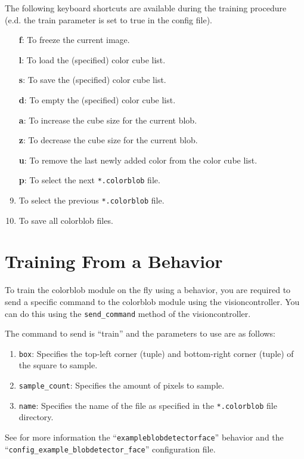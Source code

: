 \documentclass[a4paper, 10pt]{article}
\begin{document}
The following keyboard shortcuts are available during the training procedure (e.d. the train parameter is set to true in the config file).

\begin{enumerate}
    \item[\textbf{f}:] To freeze the current image.
    \item[\textbf{l}:] To load the (specified) color cube list.
    \item[\textbf{s}:] To save the (specified) color cube list.
    \item[\textbf{d}:] To empty the (specified) color cube list.
    \item[\textbf{a}:] To increase the cube size for the current blob.
    \item[\textbf{z}:] To decrease the cube size for the current blob.
    \item[\textbf{u}:] To remove the last newly added color from the color cube list.
    \item[\textbf{p}:] To select the next \lstinline{*.colorblob} file.
    \item[\textbf{o}:] To select the previous \lstinline{*.colorblob} file.
    \item[\textbf{k}:] To save all colorblob files.
\end{enumerate}

\section{Training From a Behavior}

To train the colorblob module on the fly using a behavior, you are required to send a specific command to the colorblob module using the visioncontroller.
You can do this using the \lstinline{send_command} method of the visioncontroller. 

The command to send is ``train'' and the parameters to use are as follows:
\begin{enumerate}
    \item \lstinline{box}: Specifies the top-left corner (tuple) and bottom-right corner (tuple) of the square to sample.
    \item \lstinline{sample_count}: Specifies the amount of pixels to sample.
    \item \lstinline{name}: Specifies the name of the file as specified in the \lstinline{*.colorblob} file directory.
\end{enumerate}

See for more information the ``\lstinline{exampleblobdetectorface}'' behavior and the \\
``\lstinline{config_example_blobdetector_face}'' configuration file.
\end{document}
